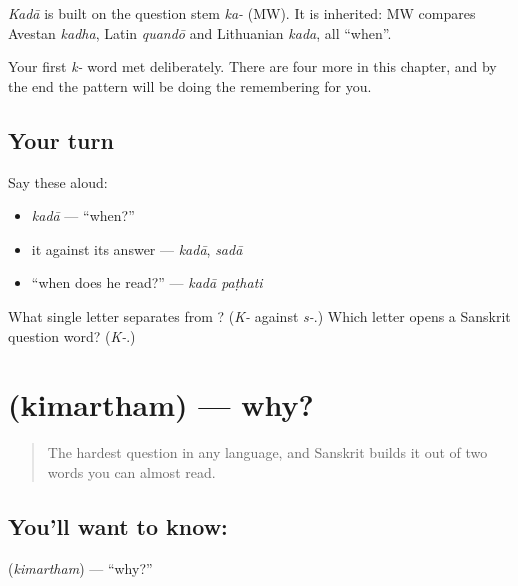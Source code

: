 \begin{cousinweb}
\emph{Kadā} is built on the question stem \emph{ka-} (MW). It is inherited: MW compares Avestan \emph{kadha}, Latin \emph{quandō} and Lithuanian \emph{kada}, all \textquotedblleft{}when\textquotedblright{}.
\end{cousinweb}

\begin{grammarlens}[title={What you've built}]
Your first \emph{k-} word met deliberately. There are four more in this chapter, and by the end the pattern will be doing the remembering for you.
\end{grammarlens}

\subsection*{Your turn}
Say these aloud:

\begin{itemize}
\raggedright
  \item \emph{kadā} — \textquotedblleft{}when?\textquotedblright{}
  \item it against its answer — \emph{kadā}, \emph{sadā}
  \item \textquotedblleft{}when does he read?\textquotedblright{} — \emph{kadā paṭhati}
\end{itemize}

\begin{tcolorbox}[breakable,colback=teal!4,colframe=teal!35!black,title={Before you move on}]
What single letter separates  from ? (\emph{K-} against \emph{s-}.) Which letter opens a Sanskrit question word? (\emph{K-}.)
\end{tcolorbox}
\section[\texorpdfstring{\sk{किमर्थम्} (kimartham)}{किमर्थम् (kimartham)}]{ (kimartham) — why?}

\label{lesson:SA-C18-why}



\begin{quote}
The hardest question in any language, and Sanskrit builds it out of two words you can almost read.
\end{quote}

\subsection*{You'll want to know: }
\textbf{} (\emph{kimartham}) — \textquotedblleft{}why?\textquotedblright{}


